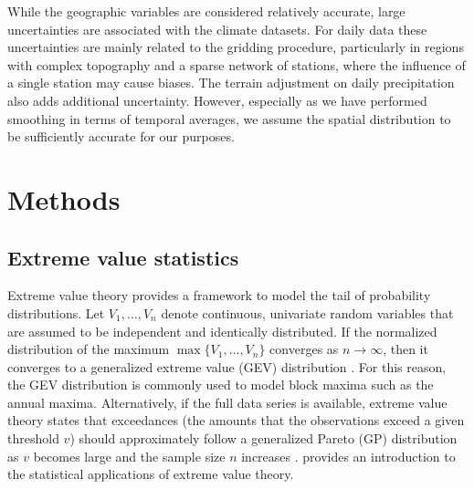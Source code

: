 \documentclass[11pt,english]{article}
\begin{document}
While the geographic variables are considered relatively accurate, large uncertainties are associated with the climate datasets. For daily data these uncertainties are mainly related to the gridding procedure, particularly in regions with complex topography and a sparse network of stations, where the influence of a single station may cause biases.  The terrain adjustment on daily precipitation \citep{Engesetetal2004b, Saloranta2012} also adds additional uncertainty.  However, especially as we have performed smoothing in terms of temporal averages, we assume the spatial distribution to be sufficiently accurate for our purposes.  

\section{Methods}\label{sec:modeling}

\subsection{Extreme value statistics}

Extreme value theory provides a framework to model the tail of probability distributions.  Let $V_1, \ldots, V_n$ denote continuous, univariate random variables that are assumed to be independent and identically distributed.  If the normalized distribution of the maximum $\max\{ V_1, \ldots, V_n \}$ converges as $n \rightarrow \infty$, then it converges to a generalized extreme value (GEV) distribution \citep{FisherTippett1928, Jenkinson1955}.  For this reason, the GEV distribution is commonly used to model block maxima such as the annual maxima.  Alternatively, if the full data series is available,  extreme value theory states that exceedances (the amounts that the observations exceed a given threshold $v$) should approximately follow a generalized Pareto (GP) distribution as $v$ becomes large and the sample size $n$ increases \citep{Pickands1975, Cooleyetal2007}.  \cite{Coles2001} provides an introduction to the statistical applications of extreme value theory. 
\end{document}
